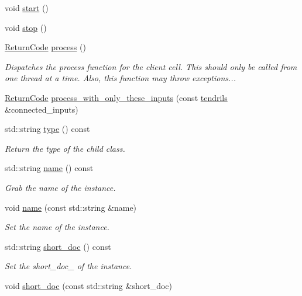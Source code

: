 \begin{DoxyCompactItemize}
void \hyperlink{structecto_1_1cell_a06abb010763ff7aeaaf2b28be4a6424a}{start} ()
\item 
void \hyperlink{structecto_1_1cell_abac52b774d350b02dc99a55c64b94bcd}{stop} ()
\item 
\hyperlink{namespaceecto_a93d82cd28db695d53963fb696582762c}{Return\+Code} \hyperlink{structecto_1_1cell_a6b810671ee21f5dddbc1206abfb999f3}{process} ()
\begin{DoxyCompactList}\small\item\em Dispatches the process function for the client cell. This should only be called from one thread at a time. Also, this function may throw exceptions... \end{DoxyCompactList}\item 
\hyperlink{namespaceecto_a93d82cd28db695d53963fb696582762c}{Return\+Code} \hyperlink{structecto_1_1cell_a407e320190ee98c1a1a3042ac3c38f0e}{process\+\_\+with\+\_\+only\+\_\+these\+\_\+inputs} (const \hyperlink{classecto_1_1tendrils}{tendrils} \&connected\+\_\+inputs)
\item 
std\+::string \hyperlink{structecto_1_1cell_ae3b84af61e78dab25f66a66773d5c5df}{type} () const 
\begin{DoxyCompactList}\small\item\em Return the type of the child class. \end{DoxyCompactList}\item 
std\+::string \hyperlink{structecto_1_1cell_a931fbc02fff66a58684ab25e00dbb2f8}{name} () const 
\begin{DoxyCompactList}\small\item\em Grab the name of the instance. \end{DoxyCompactList}\item 
void \hyperlink{structecto_1_1cell_a3956efb238f50a6983b86f430c47ca05}{name} (const std\+::string \&name)
\begin{DoxyCompactList}\small\item\em Set the name of the instance. \end{DoxyCompactList}\item 
std\+::string \hyperlink{structecto_1_1cell_aefa443962201caebb08d1a3163730639}{short\+\_\+doc} () const 
\begin{DoxyCompactList}\small\item\em Set the short\+\_\+doc\+\_\+ of the instance. \end{DoxyCompactList}\item 
void \hyperlink{structecto_1_1cell_a49d510eec19d352c5729e6a2fd149340}{short\+\_\+doc} (const std\+::string \&short\+\_\+doc)

\end{DoxyCompactItemize}
